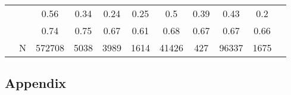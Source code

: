 \documentclass[
]{article}
\begin{document}
\begin{landscape}
\begin{table}[ht]
\begin{tabular}{l|>{\raggedright\arraybackslash}p{3.2cm}|ccccccccc}
   & \multicolumn{1}{>{\raggedleft\arraybackslash}p{2.9cm}|}{\makebox[2.9cm][r]{Lives with Child }} & 0.56 & 0.34 & 0.24 & 0.25 & 0.5 & 0.39 & 0.43 & 0.2 \\ 
   & \multicolumn{1}{>{\raggedleft\arraybackslash}p{3.4cm}|}{\makebox[3.4cm][r]{Married/Cohabiting }} & 0.74 & 0.75 & 0.67 & 0.61 & 0.68 & 0.67 & 0.67 & 0.66 \\ 
    \hline
   & N & 572708 & 5038 & 3989 & 1614 & 41426 & 427 & 96337 & 1675 \\ 
   \hline
\end{tabular}
\endgroup
\end{table}
\end{landscape}

\newpage

\subsection{Appendix}\label{sec-Appendix}

\newpage
\end{document}
